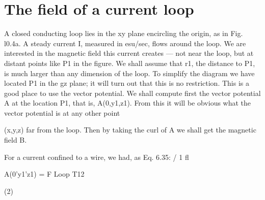 \iffalse

\section{The field of a current loop}

A closed conducting loop lies in the xy plane encircling the origin,
as in Fig. l0.4a. A steady current I, measured in esu/sec, flows
around the loop. We are interested in the magnetic field this current
creates --- not near the loop, but at distant points like P1 in the figure.
We shall assume that r1, the distance to P1, is much larger than any
dimension of the loop. To simplify the diagram we have located P1
in the gz plane; it will turn out that this is no restriction. This is a
good place to use the vector potential. We shall compute first the
vector potential A at the location P1, that is, A(0,y1,z1). From this
it will be obvious what the vector potential is at any other point

(x,y,z) far from the loop. Then by taking the curl of A we shall get
the magnetic field B.

For a current confined to a wire, we had, as Eq. 6.35:
/
1 fl

A(0'y1'z1) = F Loop T12

(2)

